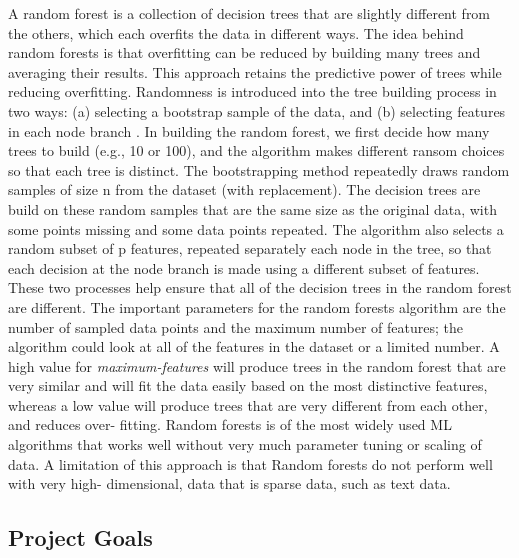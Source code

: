 \documentclass[sigconf]{acmart}
\begin{document}
A random forest is a collection of decision trees that are slightly different 
from the others, which each overfits the data in different ways. The idea 
behind random forests is that overfitting can be reduced by building many 
trees and averaging their results. This approach retains the predictive power 
of trees while reducing overfitting. Randomness is introduced into the tree 
building process in two ways: (a) selecting a bootstrap sample of the data, 
and (b) selecting features in each node branch \cite{muller17,raschka17}. In 
building the random forest, we first decide how many trees to build (e.g., 10 
or 100), and the algorithm makes different ransom choices so that each tree is 
distinct. The bootstrapping method repeatedly draws random samples of size n 
from the dataset (with replacement). The decision trees are build on these 
random samples that are the same size as the original data, with some points 
missing and some data points repeated. The algorithm also selects a random 
subset of p features, repeated separately each node in the tree, so that 
each decision at the node branch is made using a different subset of features.
These two processes help ensure that all of the decision trees in the random
forest are different. The important parameters for the random forests 
algorithm are the number of sampled data points and the maximum number of 
features; the algorithm could look at all of the features in the dataset
or a limited number. A high value for \emph{maximum-features} will produce 
trees in the random forest that are very similar and will fit the data 
easily based on the most distinctive features, whereas a low value will 
produce trees that are very different from each other, and reduces over-
fitting. Random forests is of the most widely used ML algorithms that works 
well without very much parameter tuning or scaling of data. A limitation of 
this approach is that Random forests do not perform well with very high-
dimensional, data that is sparse data, such as text data.


\subsection{Project Goals} 
\end{document}

